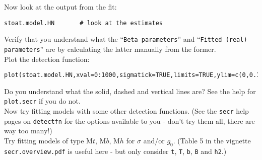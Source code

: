 Now look at the output from the fit:
\begin{verbatim}
stoat.model.HN       # look at the estimates
\end{verbatim}

Verify that you understand what the ``\verb|Beta parameters|'' and ``\verb|Fitted (real) parameters|'' are by calculating the latter manually from the former.\\

Plot the detection function:
\begin{verbatim}
plot(stoat.model.HN,xval=0:1000,sigmatick=TRUE,limits=TRUE,ylim=c(0,0.12)) 
\end{verbatim}

Do you understand what the solid, dashed and vertical lines are? See the help for \verb|plot.secr| if you do not. \\

Now try fitting models with some other detection functions. (See the \verb|secr| help pages on \verb|detectfn| for the options available to you - don't try them all, there are way too many!)\\

Try fitting models of type M$t$, M$b$, M$h$ for $\sigma$ and/or $g_0$. (Table 5 in the vignette \verb|secr.overview.pdf| is useful here - but only consider \verb|t|, \verb|T|, \verb|b|, \verb|B| and \verb|h2|.)

